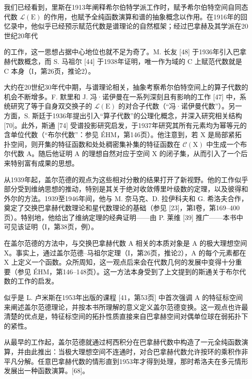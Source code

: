 
我们已经看到，里斯在1913年阐释希尔伯特学派工作时，赋予希尔伯特空间自同态代数 \(\mathcal{L}(\mathrm{E})\) 的作用，也赋予全纯函数演算和谱的抽象概念以作用。在1916年的回忆录中，他似乎已经预示赋范代数是谱理论的自然框架；经过巴拿赫及其学派在20世纪20年代

的工作，这一思想占据中心地位也就不足为奇了。M. 长友 {[}48{]} 于1936年引入巴拿赫代数概念，而 S. 马祖尔 {[}44{]} 于1938年证明，唯一作为域的 C 上赋范代数就是 C 本身（I，第26页，推论2）。

大约在20世纪30年代中期，与谱理论相关，抽象考察希尔伯特空间上的算子代数的机会不断增多。F. 默里和 J. 冯·诺伊曼在一系列深刻且有影响的工作 {[}47{]} 中，系统研究了等于自身双交换子的 \(\mathcal{L}(\mathrm{E})\) 的对合子代数（“冯·诺伊曼代数”）。另一方面，S. 斯廷于1936年提出引入“算子代数”的公理化概念，并深入研究相关结构 {[}70{]}。此外，斯通 {[}74{]} 受谱投影研究启发，于1937年研究其所有元素均为幂等元的含单位代数（“布尔代数”：参见 ÉHM，第146页）。他注意到，若 X 是局部紧拓扑空间，则开集的特征函数和处处稠密集补集的特征函数在 \(\mathcal{C}(\mathrm{X})\) 中生成一个布尔代数 A。随后他证明 A 的理想自然对应于空间 X 的闭子集，从而引入了一个后来特别富有成果的思想。

从1939年起，盖尔范德的观点为这些相对分散的结果打开了新视野。他的工作似乎部分受到维纳思想的推动，特别是其关于绝对收敛傅里叶级数的定理，以及彼得和外尔的方法。1939至1946年间，他与 M. 奈马克、D. 拉伊科夫和 G. 希洛夫合作，奠定了交换巴拿赫代数理论和星代数理论的基础（参见 {[}23{]}，第I卷，第169--400页）。特别地，他给出了维纳定理的经典证明——由 P. 莱维 {[}39{]} 推广——本书中可见该证明（I，第38页，例）。

在盖尔范德的方法中，与交换巴拿赫代数 A 相关的本质对象是 A 的极大理想空间 X。事实上，通过盖尔范德--马祖尔定理（I，第26页，推论2），A 的每个元素都在 X 上定义一个函数。众所周知，这一观点后来会在代数几何的发展中变得十分重要（参见 ÉHM，第146--148页）。这一方法本身受到了上文提到的斯通关于布尔代数的工作的启发。

似乎是 L. 卢米斯在1953年出版的课程 {[}41，第53页{]} 中首次强调 A 的特征标空间来阐述盖尔范德理论，并按本书所理解的意义定义盖尔范德变换。这一观点也许最清楚的优点是，特征标空间的拓扑性质直接来自巴拿赫空间对偶单位球在弱拓扑下的紧性。

从最早的工作起，盖尔范德就通过柯西积分在巴拿赫代数中构造了一元全纯函数演算，并由此推出：当极大理想空间不连通时，对合巴拿赫代数允许按环的乘积作非平凡分解。任意巴拿赫代数的情形直到1953年才得到处理，那时希洛夫在多元情形发展出一种函数演算。{[}68{]}。

